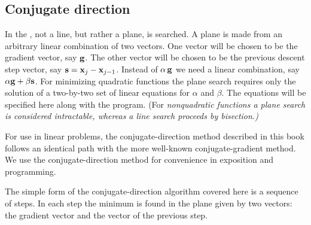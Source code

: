 
\subsection{Conjugate direction}
In the , not a line, but rather a plane,
is searched.
A plane is made from an arbitrary linear combination of two vectors.
One vector will be chosen to be the gradient vector, say  $\bold g$.
The other vector will be chosen to be the previous descent step vector,
say  $\bold s = \bold x_j - \bold x_{j-1}$.
Instead of  $\alpha \, \bold g$  we need a linear combination,
say  $\alpha \bold g + \beta  \bold s$.
For minimizing quadratic functions the plane search requires
only the solution of a two-by-two set of linear equations
for  $\alpha$  and  $\beta$.
The equations will be specified here along with the program.
(For %
\it nonquadratic %
\rm functions a plane search is considered intractable,
whereas a line search proceeds by bisection.)
\par
For use in linear problems,
the conjugate-direction method described in this book
follows an identical path with the more well-known conjugate-gradient method.
We use the conjugate-direction method
for convenience in exposition and programming.

\par
        The simple form of the conjugate-direction algorithm covered here
        is a sequence of steps.
        In each step the minimum is found in the plane given by two vectors:
        the gradient vector and the vector of the previous step.


